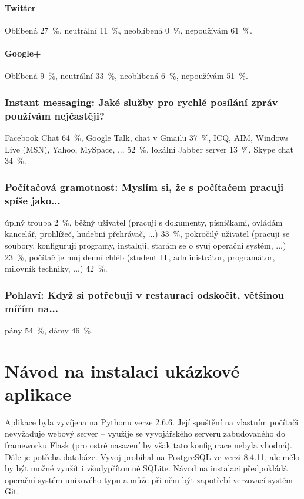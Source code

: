 \documentclass[12pt,oneside,final]{fithesis2}
\begin{document}
\subsubsection*{Twitter}
Oblíbená 27~\%,
neutrální 11~\%,
neoblíbená 0~\%,
nepoužívám 61~\%.

\subsubsection*{Google+}
Oblíbená 9~\%,
neutrální 33~\%,
neoblíbená 6~\%,
nepoužívám 51~\%.

\subsection*{Instant messaging: Jaké služby pro rychlé posílání zpráv používám nejčastěji?}
Facebook Chat 64~\%,
Google Talk, chat v Gmailu 37~\%,
ICQ, AIM, Windows Live (MSN), Yahoo, MySpace, ... 52~\%,
lokální Jabber server 13~\%,
Skype chat 34~\%.

\subsection*{Počítačová gramotnost: Myslím si, že s počítačem pracuji spíše jako...}
úplný trouba 2~\%,
běžný uživatel (pracuji s dokumenty, písničkami, ovládám kancelář, prohlížeč, hudební přehrávač, ...) 33~\%,
pokročilý uživatel (pracuji se soubory, konfiguruji programy, instaluji, starám se o svůj operační systém, ...) 23~\%,
počítač je můj denní chléb (student IT, administrátor, programátor, milovník techniky, ...) 42~\%.

\subsection*{Pohlaví: Když si potřebuji v restauraci odskočit, většinou mířím na...}
pány 54~\%,
dámy 46~\%.



\chapter{Návod na instalaci ukázkové aplikace}\label{tutorial}
Aplikace byla vyvíjena na Pythonu verze 2.6.6. Její spuštění na vlastním počítači nevyžaduje webový server -- využije se vyvojářského serveru zabudovaného do frameworku Flask (pro ostré nasazení by však tato konfigurace nebyla vhodná). Dále je potřeba databáze. Vyvoj probíhal na PostgreSQL ve verzi 8.4.11, ale mělo by být možné využít i všudypřítomné SQLite. Návod na instalaci předpokládá operační systém unixového typu a může při něm být zapotřebí verzovací systém Git.
\end{document}
